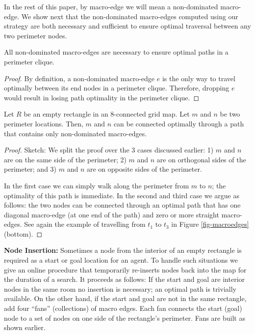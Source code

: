 In the rest of this paper, by macro-edge we will mean a non-dominated macro-edge.
We show next that the non-dominated macro-edges computed using our strategy are both
necessary and sufficient to ensure optimal traversal between any two perimeter
nodes.

\begin{proposition} All non-dominated macro-edges are necessary to ensure
optimal paths in a perimeter clique.  
\end{proposition} 
\begin{proof} By
definition, a non-dominated macro-edge $e$ is the only way to travel optimally
between its end nodes in a perimeter clique. Therefore, dropping $e$ would
result in losing path optimality in the perimeter clique.  
\end{proof}

\begin{lemma} \label{lemma-rooms} Let $R$ be an empty rectangle in
an 8-connected grid map. Let $m$ and $n$ be two perimeter locations.
Then, $m$ and $n$ can be connected optimally through a path that
contains only non-dominated macro-edges.
\end{lemma}

\begin{proof}Sketch:
We split the proof over the 3 cases discussed earlier: 1) {$m$ and $n$ are on
the same side of the perimeter;} 2) {\label{lemma-rooms-step2}$m$ and $n$ are on
orthogonal sides of the perimeter;} and 3) {\label{lemma-rooms-step3} $m$ and
$n$ are on opposite sides of the perimeter.}

In the first case we can simply walk along the perimeter from $m$ to $n$; the
optimality of this path is immediate. In the second and third case we argue as
follows:
the two nodes can be connected through an optimal path that has one diagonal macro-edge
(at one end of the path) and zero or more straight macro-edges.
See again the example of travelling from $t_1$ to $t_3$ in Figure \ref{fig-macroedges} (bottom).
\end{proof}

\noindent
\textbf{Node Insertion:}
Sometimes a node from the interior of an empty rectangle is required as a start
or goal location for an agent.  To handle such situations we give an online
procedure that temporarily re-inserts nodes back into the map for the duration
of a search.  It proceeds as follows: {If the start and goal are interior nodes
in the same room no insertion is necessary; an optimal path is trivially
available. } {On the other hand, if the start and goal are not in the same
rectangle, add four ``fans'' (collections) of macro edges.  Each fan connects
the start (goal) node to a set of nodes on one side of the rectangle's
perimeter.  Fans are built as shown earlier.}

